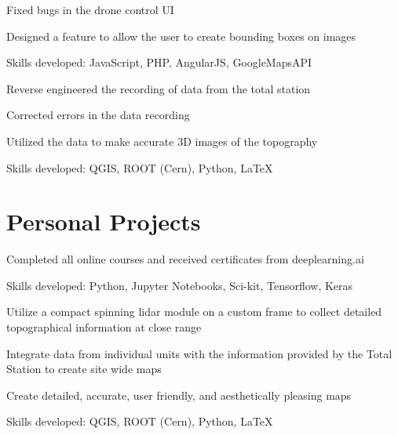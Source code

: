 \documentclass[letterpaper]{resume}
\begin{document}
\begin{compactitem}
\item Fixed bugs in the drone control UI
\item Designed a feature to allow the user to create bounding boxes on images
\item Skills developed: JavaScript, PHP, AngularJS, GoogleMapsAPI
\end{compactitem}

\begin{compactitem}
\item Reverse engineered the recording of data from the total station
\item Corrected errors in the data recording
\item Utilized the data to make accurate 3D images of the topography
\item Skills developed: QGIS, ROOT (Cern), Python, LaTeX
\end{compactitem}

\section{Personal Projects}

\begin{compactitem}
\item Completed all online courses and received certificates from deeplearning.ai
\item Skills developed: Python, Jupyter Notebooks, Sci-kit, Tensorflow, Keras
\end{compactitem}

\begin{compactitem}
\item Utilize a compact spinning lidar module on a custom frame to collect detailed topographical information at close range
\item Integrate data from individual units with the information provided by the Total Station to create site wide maps
\item Create detailed, accurate, user friendly, and aesthetically pleasing maps
\item Skills developed: QGIS, ROOT (Cern), Python, LaTeX
\end{compactitem}
\end{document}
